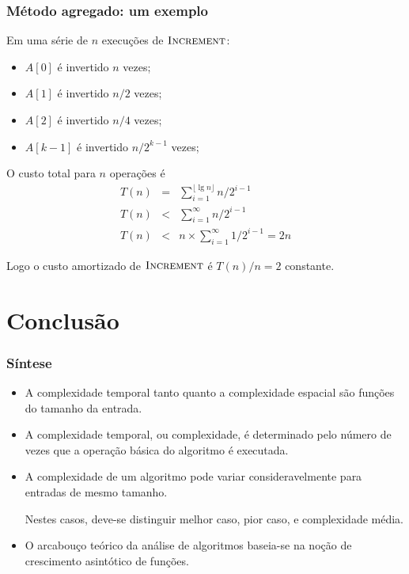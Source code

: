 \documentclass[handout]{beamer}
\begin{document}
\begin{frame}

\frametitle{Método agregado: um exemplo}

Em uma série de $n$ execuções de $\textnormal{\scshape Increment}$:
\begin{itemize}
\item $A[0]$ é invertido $n$ vezes;
\item $A[1]$ é invertido $n/2$ vezes;
\item $A[2]$ é invertido $n/4$ vezes;
\item $A[k-1]$ é invertido $n/2^{k-1}$ vezes;
\end{itemize}
O custo total para $n$ operações é 
\begin{eqnarray*}
T(n) & = & \sum_{i=1}^{\lfloor \lg n \rfloor} n/2^{i-1} \\
T(n) & < & \sum_{i=1}^{\infty} n/2^{i-1} \\
T(n) & < & n \times \sum_{i=1}^{\infty} 1/2^{i-1} = 2n
\end{eqnarray*}

Logo o custo amortizado de $\textnormal{\scshape Increment}$ é $T(n)/n = 2$ \alert{constante}.

\end{frame}

\section{Conclusão}

\begin{frame}
\frametitle{Síntese}
\begin{itemize}
\item A complexidade temporal tanto quanto a complexidade espacial são
funções do tamanho da entrada.
\item A complexidade temporal, ou complexidade, é determinado pelo número
de vezes que a operação básica do algoritmo é executada.
\item A complexidade de um algoritmo pode variar consideravelmente para
entradas de mesmo tamanho. 

Nestes casos, deve-se distinguir melhor caso, pior caso, e complexidade média.
\item O arcabouço teórico da análise de algoritmos baseia-se na noção de
  crescimento asintótico de funções.
\end{itemize}
\end{frame}
\end{document}
